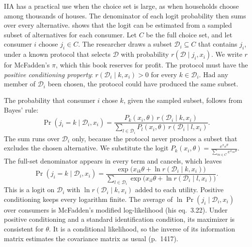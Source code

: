 \begin{remark}\label{rem:06-sampling}
IIA has a practical use when the choice set is large, as when households choose among thousands of houses. The
denominator of each logit probability then sums over every alternative. \citet[sec.~3.6, pp.~1416--1417]{McFadden1984}
shows that the logit can be estimated from a sampled subset of alternatives for each consumer. Let $C$ be the full
choice set, and let consumer $i$ choose $j_i \in C$. The researcher draws a subset $\mathcal{D}_i \subseteq C$ that
contains $j_i$, under a known protocol that selects $\mathcal{D}$ with probability $r(\mathcal{D} \mid j_i, x_i)$. We
write $r$ for McFadden's $\pi$, which this book reserves for profit. The protocol must have the \emph{positive
conditioning property}: $r(\mathcal{D}_i \mid k, x_i) > 0$ for every $k \in \mathcal{D}_i$. Had any member of
$\mathcal{D}_i$ been chosen, the protocol could have produced the same subset.

The probability that consumer $i$ chose $k$, given the sampled subset, follows from Bayes' rule:
\begin{equation*}
\Pr(j_i = k \mid \mathcal{D}_i, x_i)
= \frac{P_k(x_i, \theta)\, r(\mathcal{D}_i \mid k, x_i)}{\sum_{l \in \mathcal{D}_i} P_l(x_i, \theta)\, r(\mathcal{D}_i \mid l, x_i)} .
\end{equation*}
The sum runs over $\mathcal{D}_i$ only, because the protocol never produces a subset that excludes the chosen
alternative. We substitute the logit $P_k(x_i, \theta) = \frac{e^{x_{ik}\theta}}{\sum_{m \in C}e^{x_{im}\theta}}$. The
full-set denominator appears in every term and cancels, which leaves
\begin{equation}\label{eq:06-sampled-logit}
\Pr(j_i = k \mid \mathcal{D}_i, x_i)
= \frac{\exp\big(x_{ik}\theta + \ln r(\mathcal{D}_i \mid k, x_i)\big)}{\sum_{l \in \mathcal{D}_i}\exp\big(x_{il}\theta + \ln r(\mathcal{D}_i \mid l, x_i)\big)} .
\end{equation}
This is a logit on $\mathcal{D}_i$ with $\ln r(\mathcal{D}_i \mid k, x_i)$ added to each utility. Positive conditioning
keeps every logarithm finite. The average of $\ln\Pr(j_i \mid \mathcal{D}_i, x_i)$ over consumers is McFadden's modified
log-likelihood (his eq.~3.22). Under positive conditioning and a standard identification condition, its maximizer is
consistent for $\theta$. It is a conditional likelihood, so the inverse of its information matrix estimates the
covariance matrix as usual (p.~1417).


\end{remark}
